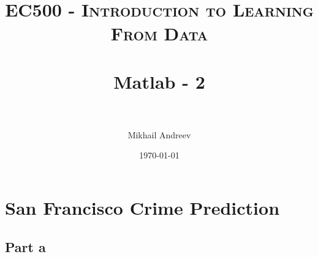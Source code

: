 \documentclass[paper=a4, fontsize=11pt]{scrartcl} %
\title{	
	\normalfont \normalsize 
	\textsc{EC500 - Introduction to Learning From Data} \\ [25pt] %
	\horrule{0.5pt} \\[0.4cm] %
	\huge Matlab - 2 \\ %
	\horrule{2pt} \\[0.5cm] %
}
\author{Mikhail Andreev} %
\date{\normalsize\today} %
\numberwithin{equation}{section} %
\numberwithin{figure}{section} %
\numberwithin{table}{section} %
\begin{document}
	
	\maketitle %
	
	\newpage
	
	
	\section{San Francisco Crime Prediction}
	
	
	\subsection{Part a}
	
\end{document}
